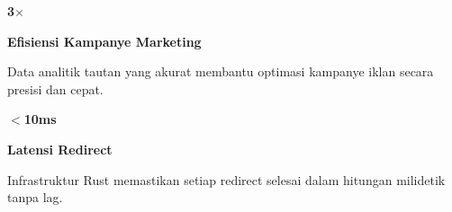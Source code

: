 \documentclass[a4paper]{article}
\begin{document}
\noindent
\begin{minipage}[t]{0.485\textwidth}
    \noindent\colorbox{BlueBg}{%
        \begin{minipage}[t][2.7cm][c]{\dimexpr\linewidth-2\fboxsep\relax}
            \centering
            {\fontsize{20}{24}\selectfont\bfseries\color{CyanPrimary} 3$\times$}\par\vspace{2pt}
            {\fontsize{9.5}{12}\selectfont\bfseries\color{BlueDark} Efisiensi Kampanye Marketing}\par\vspace{2pt}
            {\fontsize{8.5}{11}\selectfont\color{TextDark}Data analitik tautan yang akurat membantu optimasi kampanye iklan secara presisi dan cepat.}
        \end{minipage}}\par
    \vspace{6pt}
    \noindent\colorbox{BlueBg}{%
        \begin{minipage}[t][2.7cm][c]{\dimexpr\linewidth-2\fboxsep\relax}
            \centering
            {\fontsize{20}{24}\selectfont\bfseries\color{CyanPrimary} $<$10ms}\par\vspace{2pt}
            {\fontsize{9.5}{12}\selectfont\bfseries\color{BlueDark} Latensi Redirect}\par\vspace{2pt}
            {\fontsize{8.5}{11}\selectfont\color{TextDark}Infrastruktur Rust memastikan setiap redirect selesai dalam hitungan milidetik tanpa lag.}
        \end{minipage}}%
\end{minipage}%
\hfill
\end{document}
